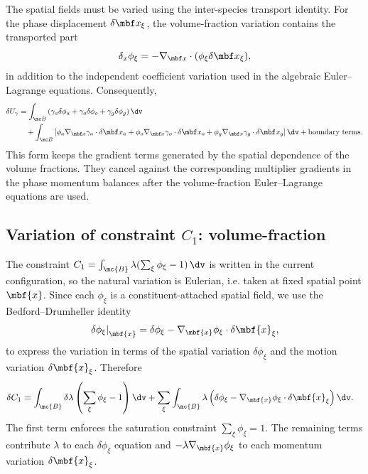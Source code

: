 The spatial fields must be varied using the inter-species transport identity.
For the phase displacement $\delta\mbf x_\xi$, the volume-fraction variation
contains the transported part
\[
  \delta_x\phi_\xi = -\nabla_{\mbf x}\cdot(\phi_\xi\delta\mbf x_\xi),
\]
in addition to the independent coefficient variation used in the algebraic
Euler--Lagrange equations.  Consequently,
\begin{align}
  \delta U_\gamma
  &= \int_{\mc B}\left(\gamma_a\delta\phi_a+\gamma_o\delta\phi_o+\gamma_g\delta\phi_g\right)\dv \notag \\
  &\quad
  + \int_{\mc B}\left[\phi_a\nabla_{\mbf x}\gamma_a\cdot\delta\mbf x_a
      + \phi_o\nabla_{\mbf x}\gamma_o\cdot\delta\mbf x_o
      + \phi_g\nabla_{\mbf x}\gamma_g\cdot\delta\mbf x_g\right]\dv
  + \text{boundary terms}.
  \label{eq:deltaU_fg}
\end{align}
This form keeps the gradient terms generated by the spatial dependence of the
volume fractions.  They cancel against the corresponding multiplier gradients in
the phase momentum balances after the volume-fraction Euler--Lagrange equations
are used.

\subsection{Variation of constraint $C_1$: volume-fraction}
\label{sec:var_C1_app}

The constraint $C_1 = \int_{\mc{B}} \lambda(\sum_\xi\phi_\xi - 1)\,\dv$ is written in the current configuration, so the natural variation is Eulerian, i.e. taken at fixed spatial point $\mbf{x}$.  Since each $\phi_\xi$ is a constituent-attached spatial field, we use the Bedford--Drumheller identity
\begin{equation}
  \left.\delta\phi_\xi\right\vert_{\mbf{x}}
  = \delta\phi_\xi - \nabla_{\mbf{x}}\phi_\xi\cdot\delta\mbf{x}_\xi,
  \label{eq:delta_phi_BD_local}
\end{equation}
to express the variation in terms of the spatial variation $\delta\phi_\xi$ and the motion variation $\delta\mbf{x}_\xi$. Therefore
\begin{align}
  \delta C_1
  &= \int_{\mc{B}} \delta\lambda \left(\sum_\xi\phi_\xi - 1\right) \dv
  + \sum_\xi \int_{\mc{B}} \lambda\left(\delta\phi_\xi - \nabla_{\mbf{x}}\phi_\xi\cdot\delta\mbf{x}_\xi\right) \dv.
  \label{eq:deltaC1_app}
\end{align}
The first term enforces the saturation constraint $\sum_\xi\phi_\xi = 1$. The remaining terms contribute $\lambda$ to each $\delta\phi_\xi$ equation and $-\lambda\nabla_{\mbf{x}}\phi_\xi$ to each momentum variation $\delta\mbf{x}_\xi$.

